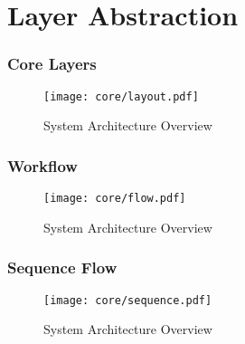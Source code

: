\section{Layer Abstraction}

\begin{frame}
  \frametitle{Core Layers}
  \begin{figure}
    \centering
    \texttt{[image: core/layout.pdf]} %
    \caption{System Architecture Overview}
  \end{figure}
\end{frame}

\begin{frame}
  \frametitle{Workflow}
  \begin{figure}
    \centering
    \texttt{[image: core/flow.pdf]} %
    \caption{System Architecture Overview}
  \end{figure}
\end{frame}

\begin{frame}
  \frametitle{Sequence Flow}
  \begin{figure}
    \centering
    \texttt{[image: core/sequence.pdf]} %
    \caption{System Architecture Overview}
  \end{figure}
\end{frame}

